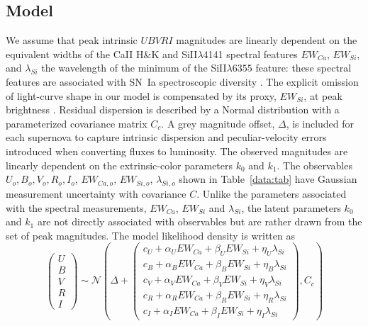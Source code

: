 \documentclass{aastex61}   	%
\begin{document}
\subsection{Model}
We assume 
that  peak intrinsic $UBVRI$ magnitudes are linearly dependent
on the
 equivalent widths of the CaII H\&K and SiII$\lambda$4141 spectral features
$EW_{Ca}$, $EW_{Si}$,
and $\lambda_{Si}$ the wavelength of the minimum of 
the SiII$\lambda6355$ feature:
these spectral features are associated with SN~Ia  spectroscopic diversity  
\citep{2006PASP..118..560B, 2008A&A...492..535A, 2009A&A...500L..17B, 2009PASP..121..238B, 2009ApJ...699L.139W, 2011ApJ...729...55F}.
The explicit omission of light-curve shape in our model is compensated by its proxy,
$EW_{Si}$, at peak brightness
\citep{2008A&A...492..535A, 2011A&A...529L...4C}. 
Residual dispersion is described by a Normal distribution with a parameterized covariance matrix
$C_c$.  A grey magnitude offset, $\Delta$, is included for each supernova
to capture intrinsic dispersion and peculiar-velocity errors introduced when converting fluxes to luminosity.
The observed magnitudes are linearly dependent on the
extrinsic-color parameters $k_0$ and $k_1$.  
The observables
$U_o, B_o, V_o, R_o, I_o$, $EW_{Ca,o}$, $EW_{Si,o}$, $\lambda_{Si,o}$
shown in Table~\ref{data:tab} have Gaussian measurement uncertainty with covariance $C$.
Unlike the parameters associated with
the spectral measurements, $EW_{Ca}$, $EW_{Si}$ and $\lambda_{Si}$,  the latent
parameters $k_0$ and $k_1$ are not directly associated
with observables but are rather drawn from the set of peak magnitudes.
The model 
likelihood density
is written as
\begin{equation}
\begin{pmatrix}
U\\B\\V\\R\\I
\end{pmatrix}
\sim \mathcal{N}
\left(
\Delta +
\begin{pmatrix}
c_U+\alpha_U EW_{Ca} + \beta_U EW_{Si} + \eta_U \lambda_{Si} \\
c_B+\alpha_B EW_{Ca} + \beta_B EW_{Si} + \eta_B \lambda_{Si}  \\
c_V+\alpha_V EW_{Ca} + \beta_V EW_{Si} + \eta_V \lambda_{Si} \\
c_R+\alpha_R EW_{Ca} + \beta_R EW_{Si} + \eta_R \lambda_{Si} \\
c_I+\alpha_I EW_{Ca} + \beta_I EW_{Si}+ \eta_I \lambda_{Si}
\end{pmatrix}
,C_{c}
\right)
\label{ewsiv:eqn}
\end{equation}
\end{document}
